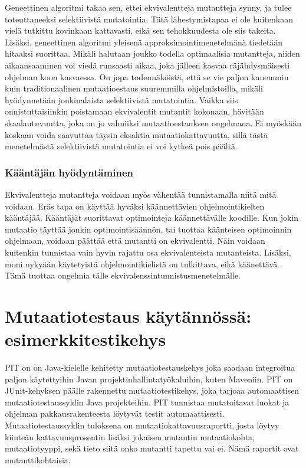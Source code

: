 \documentclass{tktltiki}
\begin{document}
Geneettinen algoritmi takaa sen, ettei ekvivalentteja mutantteja synny, ja tulee toteuttaneeksi selektiivistä mutatointia. Tätä lähestymistapaa ei ole kuitenkaan vielä tutkittu kovinkaan kattavasti, eikä sen tehokkuudesta ole siis takeita. Lisäksi, geneettinen algoritmi yleisenä approksimointimenetelmänä tiedetään hitaaksi suorittaa. Mikäli halutaan joukko todella optimaalisia mutantteja, niiden aikaansaaminen voi viedä runsaasti aikaa, joka jälleen kasvaa räjähdysmäisesti ohjelman koon kasvaessa. On jopa todennäköistä, että se vie paljon kauemmin kuin traditionaalinen mutaatioestaus suuremmilla ohjelmistoilla, mikäli hyödynnetään jonkinalaista selektiivistä mutatointia. Vaikka siis onnistuttaisiinkin poistamaan ekvivalentit mutantit kokonaan, hävitään skaalautuvuutta, joka on jo valmiiksi mutaatioestauksen ongelmana. Ei myöskään koskaan voida saavuttaa täysin eksaktia mutaatiokattavuutta, sillä tästä menetelmästä selektiivistä mutatointia ei voi kytkeä pois päältä.

\subsubsection{Kääntäjän hyödyntäminen}
Ekvivalentteja mutantteja voidaan myös vähentää tunnistamalla niitä mitä voidaan. Eräs tapa on käyttää hyväksi käännettävien ohjelmointikielten kääntäjää. Kääntäjät suorittavat optimointeja käännettävälle koodille. Kun jokin mutaatio täyttää jonkin optimointisäännön, tai tuottaa käänteisen optimoinnin ohjelmaan, voidaan päättää että mutantti on ekvivalentti. Näin voidaan kuitenkin tunnistaa vain hyvin rajattu osa ekvivalenteista mutanteista. Lisäksi, moni nykyään käytetyistä ohjelmointikielistä on tulkittava, eikä käänettävä. Tämä tuottaa ongelmia tälle ekvivalenssintunnistusmenetelmälle. 

\section{Mutaatiotestaus käytännössä: esimerkkitestikehys}
PIT on on Java-kielelle kehitetty mutaatiotestauskehys joka saadaan integroitua paljon käytettyihin Javan projektinhallintatyökaluihin, kuten Maveniin. PIT on JUnit-kehyksen päälle rakennettu mutaatiotestikehys, joka tarjoaa automaattisen mutaatiotestaussyklin Java projekteihin. PIT tunnistaa mutatoitavat luokat ja ohjelman pakkausrakenteesta löytyvät testit automaattisesti. Mutaatiotestaussyklin tuloksena on mutaatiokattavuusraportti, josta löytyy kiinteän kattavuusprosentin lisäksi jokaisen mutantin mutaatiokohta, mutaatiotyyppi, sekä tieto siitä onko mutantti tapettu vai ei. Nämä raportit ovat mutanttikohtaisia. 
\end{document}
